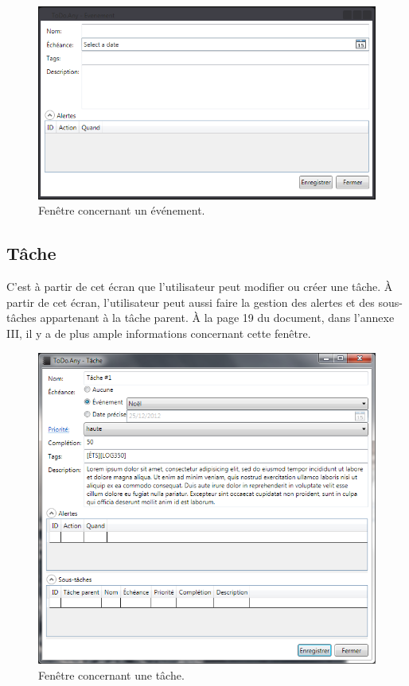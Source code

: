 \documentclass[letterpaper, oneside, 12pt, these, creativecommons]{thETS}
\begin{document}
\begin{figure}[H!]
	\centering
	\includegraphics[width=1\textwidth]{fenetre_evenement.png}
	\caption{Fenêtre concernant un événement.}
\end{figure}

\newpage

\subsection{Tâche}

C'est à partir de cet écran que l'utilisateur peut modifier ou créer une tâche. À partir de cet écran, l'utilisateur peut aussi faire la gestion des alertes et des sous-tâches appartenant à la tâche parent. À la page 19 du document, dans l'annexe III, il y a de plus ample informations concernant cette fenêtre.

\begin{figure}[H!]
	\centering
	\includegraphics[width=1\textwidth]{fenetre_tache.png}
	\caption{Fenêtre concernant une tâche.}
\end{figure}
\end{document}
